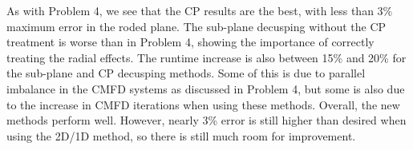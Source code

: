 \begin{table}
\centering
\caption[VERA Problem 5 Decusping Results]{VERA Problem 5 decusping results for the partially rodded plane}\label{t:p5decusp}
\end{table}

As with Problem 4, we see that the CP results are the best, with less than 3\% maximum error in the roded plane.  The sub-plane decusping without the CP treatment is worse than in Problem 4, showing the importance of correctly treating the radial effects.  The runtime increase is also between 15\% and 20\% for the sub-plane and CP decusping methods.  Some of this is due to parallel imbalance in the CMFD systems as discussed in Problem 4, but some is also due to the increase in CMFD iterations when using these methods.  Overall, the new methods perform well.  However, nearly 3\% error is still higher than desired when using the 2D/1D method, so there is still much room for improvement.